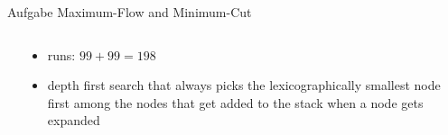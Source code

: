 \begin{frame}[allowframebreaks]{Aufgabe \thesection}{Maximum-Flow and Minimum-Cut}
\begin{solution}
  \end{solution}
  \begin{solution}
    \begin{columns}
      \begin{column}{0.5\textwidth}
      \end{column}
      \begin{column}{0.5\textwidth}
        \begin{itemize}
          \item \alert{runs:} $99 + 99 = 198$
          \item \alert{depth first search} that always picks the lexicographically smallest node first among the nodes that get added to the stack when a node gets expanded
        \end{itemize}
      \end{column}
    \end{columns}
  \end{solution}
\end{frame}

